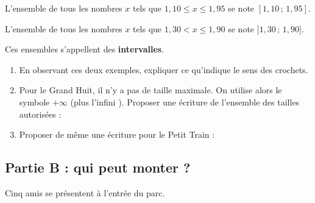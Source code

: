 \documentclass{article}
\begin{document}
\begin{tcolorbox}[colback=white, colframe=black, title=Une nouvelle notation]
  L'ensemble de tous les nombres $x$ tels que $1{,}10 \leq x \leq 1{,}95$ se note $[1{,}10\,;\,1{,}95]$.

  L'ensemble de tous les nombres $x$ tels que $1{,}30 < x \leq 1{,}90$ se note $]1{,}30\,;\,1{,}90]$.

  Ces ensembles s'appellent des \textbf{intervalles}.
\end{tcolorbox}

\begin{enumerate}[resume]
  \item En observant ces deux exemples, expliquer ce qu'indique le sens des crochets.

  \medskip
  \dotfill

  \medskip
  \dotfill

  \item Pour le Grand Huit, il n'y a pas de taille maximale. On utilise alors le symbole $+\infty$ (\og plus l'infini \fg{}). Proposer une écriture de l'ensemble des tailles autorisées :
  \dotfill
  \item Proposer de même une écriture pour le Petit Train : \dotfill
\end{enumerate}

\newpage

\subsection*{Partie B : qui peut monter ?}

Cinq amis se présentent à l'entrée du parc.
\end{document}
